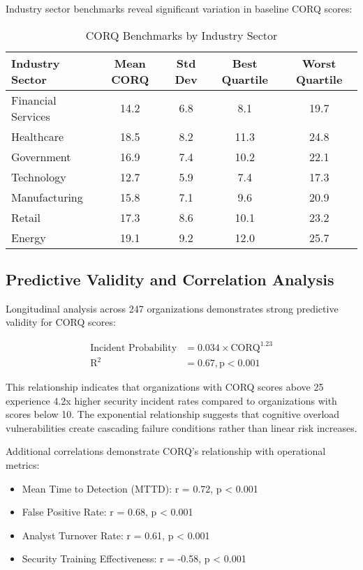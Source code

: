 \documentclass[11pt,a4paper]{article}
\begin{document}
Industry sector benchmarks reveal significant variation in baseline CORQ scores:

\begin{table}[H]
\centering
\caption{CORQ Benchmarks by Industry Sector}
\label{tab:industry_benchmarks}
\begin{tabular}{lcccc}
\toprule
Industry Sector & Mean CORQ & Std Dev & Best Quartile & Worst Quartile \\
\midrule
Financial Services & 14.2 & 6.8 & 8.1 & 19.7 \\
Healthcare & 18.5 & 8.2 & 11.3 & 24.8 \\
Government & 16.9 & 7.4 & 10.2 & 22.1 \\
Technology & 12.7 & 5.9 & 7.4 & 17.3 \\
Manufacturing & 15.8 & 7.1 & 9.6 & 20.9 \\
Retail & 17.3 & 8.6 & 10.1 & 23.2 \\
Energy & 19.1 & 9.2 & 12.0 & 25.7 \\
\bottomrule
\end{tabular}
\end{table}

\subsection{Predictive Validity and Correlation Analysis}

Longitudinal analysis across 247 organizations demonstrates strong predictive validity for CORQ scores:

\begin{align}
\text{Incident Probability} &= 0.034 \times \text{CORQ}^{1.23} \\
\text{R}^2 &= 0.67, \text{p} < 0.001
\end{align}

This relationship indicates that organizations with CORQ scores above 25 experience 4.2x higher security incident rates compared to organizations with scores below 10. The exponential relationship suggests that cognitive overload vulnerabilities create cascading failure conditions rather than linear risk increases.

Additional correlations demonstrate CORQ's relationship with operational metrics:

\begin{itemize}
\item Mean Time to Detection (MTTD): r = 0.72, p < 0.001
\item False Positive Rate: r = 0.68, p < 0.001  
\item Analyst Turnover Rate: r = 0.61, p < 0.001
\item Security Training Effectiveness: r = -0.58, p < 0.001
\end{itemize}
\end{document}
